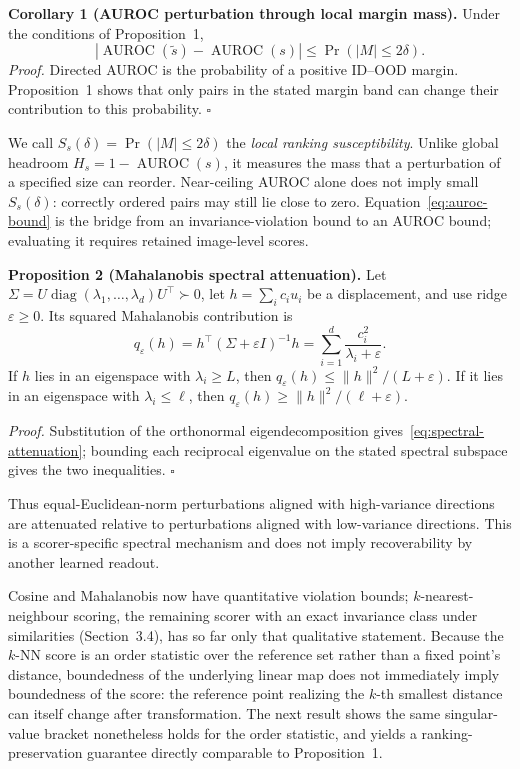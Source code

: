 \documentclass[pdflatex,sn-basic]{sn-jnl}
\theoremstyle{plain}
\theoremstyle{definition}
\theoremstyle{remark}
\begin{document}
\textbf{Corollary 1 (AUROC perturbation through local margin mass).} Under the conditions of Proposition~1,
\begin{equation}
|\operatorname{AUROC}(\widetilde{s})-\operatorname{AUROC}(s)|
\le \Pr(|M|\le2\delta).
\label{eq:auroc-bound}
\end{equation}
\emph{Proof.} Directed AUROC is the probability of a positive ID--OOD margin. Proposition~1 shows that only pairs in the stated margin band can change their contribution to this probability. \hfill$\square$

We call $S_s(\delta)=\Pr(|M|\le2\delta)$ the \emph{local ranking susceptibility}. Unlike global headroom $H_s=1-\operatorname{AUROC}(s)$, it measures the mass that a perturbation of a specified size can reorder. Near-ceiling AUROC alone does not imply small $S_s(\delta)$: correctly ordered pairs may still lie close to zero. Equation~\eqref{eq:auroc-bound} is the bridge from an invariance-violation bound to an AUROC bound; evaluating it requires retained image-level scores.

\textbf{Proposition 2 (Mahalanobis spectral attenuation).} Let $\Sigma=U\operatorname{diag}(\lambda_1,\ldots,\lambda_d)U^\top\succ0$, let $h=\sum_i c_i u_i$ be a displacement, and use ridge $\varepsilon\ge0$. Its squared Mahalanobis contribution is
\begin{equation}
q_\varepsilon(h)=h^\top(\Sigma+\varepsilon I)^{-1}h
=\sum_{i=1}^{d}\frac{c_i^2}{\lambda_i+\varepsilon}.
\label{eq:spectral-attenuation}
\end{equation}
If $h$ lies in an eigenspace with $\lambda_i\ge L$, then
$q_\varepsilon(h)\le\|h\|^2/(L+\varepsilon)$. If it lies in an eigenspace with $\lambda_i\le \ell$, then $q_\varepsilon(h)\ge\|h\|^2/(\ell+\varepsilon)$.

\emph{Proof.} Substitution of the orthonormal eigendecomposition gives~\eqref{eq:spectral-attenuation}; bounding each reciprocal eigenvalue on the stated spectral subspace gives the two inequalities. \hfill$\square$

Thus equal-Euclidean-norm perturbations aligned with high-variance directions are attenuated relative to perturbations aligned with low-variance directions. This is a scorer-specific spectral mechanism and does not imply recoverability by another learned readout.

Cosine and Mahalanobis now have quantitative violation bounds; $k$-nearest-neighbour scoring, the remaining scorer with an exact invariance class under similarities (Section~3.4), has so far only that qualitative statement. Because the $k$-NN score is an order statistic over the reference set rather than a fixed point's distance, boundedness of the underlying linear map does not immediately imply boundedness of the score: the reference point realizing the $k$-th smallest distance can itself change after transformation. The next result shows the same singular-value bracket nonetheless holds for the order statistic, and yields a ranking-preservation guarantee directly comparable to Proposition~1.
\end{document}

